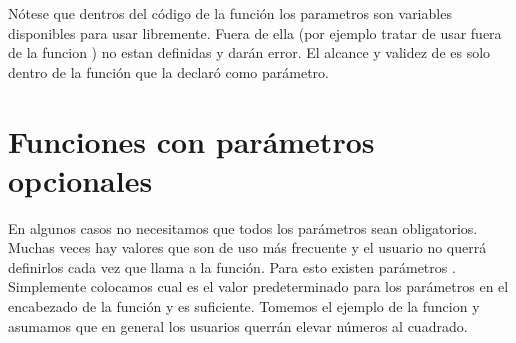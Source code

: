 \documentclass[a5paper,9pt,spanish]{sphinxmanual}
\begin{document}
\begin{sphinxVerbatim}[commandchars=\\\{\}]

    
     
       

\end{sphinxVerbatim}

\sphinxAtStartPar
Nótese que dentros del código de la función los parametros son variables disponibles
para usar libremente. Fuera de ella (por ejemplo tratar de usar  fuera de la
funcion ) no estan definidas y darán error. El alcance y validez de 
es solo dentro de la función que la declaró como parámetro.


\section{Funciones con parámetros opcionales}
\label{\detokenize{fn:funciones-con-parametros-opcionales}}
\sphinxAtStartPar
En algunos casos no necesitamos que todos los parámetros sean obligatorios.
Muchas veces hay valores que son de uso más frecuente y el usuario no querrá
definirlos cada vez que llama a la función.
Para esto existen parámetros . Simplemente colocamos cual es el
valor predeterminado para los parámetros en el encabezado de la función y
es suficiente.
Tomemos el ejemplo de la funcion  y asumamos que en general los
usuarios querrán elevar números al cuadrado.
\end{document}
